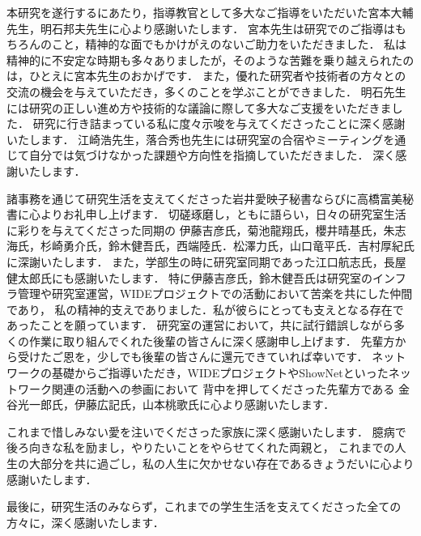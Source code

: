 本研究を遂行するにあたり，指導教官として多大なご指導をいただいた宮本大輔先生，明石邦夫先生に心より感謝いたします．
宮本先生は研究でのご指導はもちろんのこと，精神的な面でもかけがえのないご助力をいただきました．
私は精神的に不安定な時期も多々ありましたが，そのような苦難を乗り越えられたのは，ひとえに宮本先生のおかげです．
また，優れた研究者や技術者の方々との交流の機会を与えていただき，多くのことを学ぶことができました．
明石先生には研究の正しい進め方や技術的な議論に際して多大なご支援をいただきました．
研究に行き詰まっている私に度々示唆を与えてくださったことに深く感謝いたします．
江崎浩先生，落合秀也先生には研究室の合宿やミーティングを通じて自分では気づけなかった課題や方向性を指摘していただきました．
深く感謝いたします．

諸事務を通じて研究生活を支えてくださった岩井愛映子秘書ならびに高橋富美秘書に心よりお礼申し上げます．
切磋琢磨し，ともに語らい，日々の研究室生活に彩りを与えてくださった同期の
伊藤吉彦氏，菊池龍翔氏，櫻井晴基氏，朱志海氏，杉崎勇介氏，鈴木健吾氏，西端陸氏．松澤力氏，山口竜平氏．吉村厚紀氏
に深謝いたします．
また，学部生の時に研究室同期であった江口航志氏，長屋健太郎氏にも感謝いたします．
特に伊藤吉彦氏，鈴木健吾氏は研究室のインフラ管理や研究室運営，WIDEプロジェクトでの活動において苦楽を共にした仲間であり，
私の精神的支えでありました．私が彼らにとっても支えとなる存在であったことを願っています．
研究室の運営において，共に試行錯誤しながら多くの作業に取り組んでくれた後輩の皆さんに深く感謝申し上げます．
先輩方から受けたご恩を，少しでも後輩の皆さんに還元できていれば幸いです．
ネットワークの基礎からご指導いただき，WIDEプロジェクトやShowNetといったネットワーク関連の活動への参画において
背中を押してくださった先輩方である
金谷光一郎氏，伊藤広記氏，山本桃歌氏に心より感謝いたします．

これまで惜しみない愛を注いでくださった家族に深く感謝いたします．
臆病で後ろ向きな私を励まし，やりたいことをやらせてくれた両親と，
これまでの人生の大部分を共に過ごし，私の人生に欠かせない存在であるきょうだいに心より感謝いたします．

最後に，研究生活のみならず，これまでの学生生活を支えてくださった全ての方々に，深く感謝いたします．
